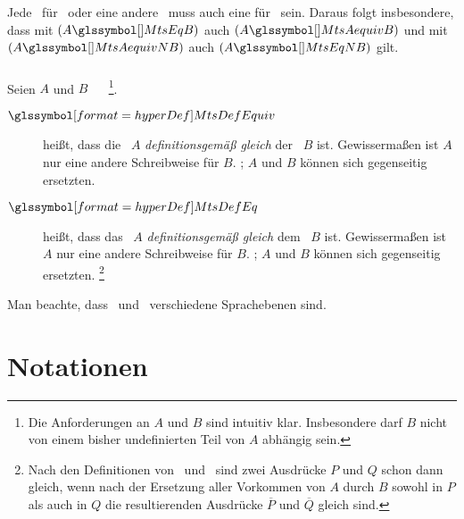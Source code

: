 Jede \interessierendeEigenschaft\ für \MtsAequiv\ oder eine andere \Aequivalenz\ muss auch eine für \MtsEq\ sein.
Daraus folgt insbesondere, dass mit $(A \MtsEq B)$ auch $(A \MtsAequiv B)$ und mit $(A \MtsAequivN B)$ auch $(A \MtsEqN B)$ gilt.

\subsubsection[Definitionen]{\Definitionen}%
\label {subsub-Definitionen}

Seien $A$ und $B$ \Aussagen\ \textbzw\ \Objekte%
\footnote{%
	Die Anforderungen an $A$ und $B$ sind intuitiv klar.
	Insbesondere darf $B$ nicht von einem bisher undefinierten Teil von $A$ abhängig sein.
}.
\begin{description}
	\item[$\defSym{\MtsDefEquiv}$]  \label{def-Metadefinition}
	 heißt, dass die \Aussage\ $A$ \emph{definitionsgemäß gleich} der \Aussage\ $B$ ist.
	Gewissermaßen ist $A$ nur eine andere Schreibweise für $B$.
	; $A$ und $B$ können sich gegenseitig ersetzten.
	\item[$\defSym{\MtsDefEq}$]  \label{def-Definition}
	 heißt, dass das \Objekt\ $A$ \emph{definitionsgemäß gleich} dem \Objekt\ $B$ ist.
	Gewissermaßen ist $A$ nur eine andere Schreibweise für $B$.
	; $A$ und $B$ können sich gegenseitig ersetzten.%
	\footnote{%
		Nach den Definitionen von \MtsDefEquiv\ und \MtsDefEq\ sind zwei Ausdrücke $P$ und $Q$ schon dann gleich, wenn nach der Ersetzung aller Vorkommen von $A$ durch $B$ sowohl in $P$ als auch in $Q$ die resultierenden Ausdrücke $\overline{P}$ und $\overline{Q}$ gleich sind.
	}
\end{description}
Man beachte, dass \MtsDefEquiv\ und \MtsDefEq\ verschiedene Sprachebenen sind.

\section     {Notationen}%
\label   {sec-Notationen}

